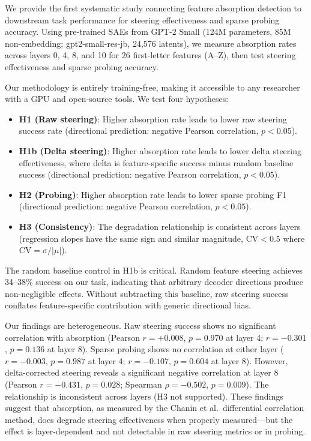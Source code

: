\documentclass{article}
\begin{document}
We provide the first systematic study connecting feature absorption detection to downstream task performance for steering effectiveness and sparse probing accuracy. Using pre-trained SAEs from GPT-2 Small (124M parameters, 85M non-embedding; gpt2-small-res-jb, 24,576 latents), we measure absorption rates across layers 0, 4, 8, and 10 for 26 first-letter features (A--Z), then test steering effectiveness and sparse probing accuracy.

Our methodology is entirely training-free, making it accessible to any researcher with a GPU and open-source tools. We test four hypotheses:

\begin{itemize}
    \item \textbf{H1 (Raw steering)}: Higher absorption rate leads to lower raw steering success rate (directional prediction: negative Pearson correlation, $p < 0.05$).
    \item \textbf{H1b (Delta steering)}: Higher absorption rate leads to lower delta steering effectiveness, where delta is feature-specific success minus random baseline success (directional prediction: negative Pearson correlation, $p < 0.05$).
    \item \textbf{H2 (Probing)}: Higher absorption rate leads to lower sparse probing F1 (directional prediction: negative Pearson correlation, $p < 0.05$).
    \item \textbf{H3 (Consistency)}: The degradation relationship is consistent across layers (regression slopes have the same sign and similar magnitude, $\text{CV} < 0.5$ where $\text{CV} = \sigma / |\mu|$).
\end{itemize}

The random baseline control in H1b is critical. Random feature steering achieves 34--38\% success on our task, indicating that arbitrary decoder directions produce non-negligible effects. Without subtracting this baseline, raw steering success conflates feature-specific contribution with generic directional bias.

Our findings are heterogeneous. Raw steering success shows no significant correlation with absorption (Pearson $r = +0.008$, $p = 0.970$ at layer 4; $r = -0.301$, $p = 0.136$ at layer 8). Sparse probing shows no correlation at either layer ($r = -0.003$, $p = 0.987$ at layer 4; $r = -0.107$, $p = 0.604$ at layer 8). However, delta-corrected steering reveals a significant negative correlation at layer 8 (Pearson $r = -0.431$, $p = 0.028$; Spearman $\rho = -0.502$, $p = 0.009$). The relationship is inconsistent across layers (H3 not supported). These findings suggest that absorption, as measured by the Chanin et al.~differential correlation method, does degrade steering effectiveness when properly measured---but the effect is layer-dependent and not detectable in raw steering metrics or in probing.
\end{document}
